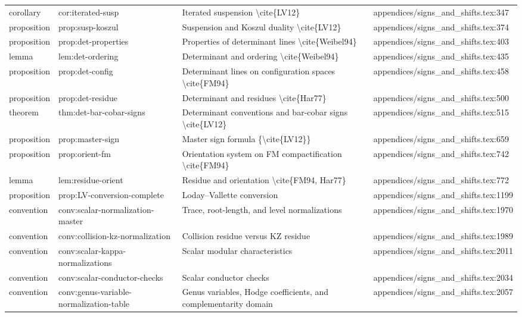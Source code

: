 \documentclass[11pt]{article}
\begin{document}
\begin{longtable}{L{0.10\textwidth}L{0.26\textwidth}L{0.42\textwidth}L{0.22\textwidth}}
corollary & cor:iterated-susp & Iterated suspension \textbackslash{}cite\{LV12\} & appendices/signs\_and\_shifts.tex:347\\
proposition & prop:susp-koszul & Suspension and Koszul duality \textbackslash{}cite\{LV12\} & appendices/signs\_and\_shifts.tex:374\\
proposition & prop:det-properties & Properties of determinant lines \textbackslash{}cite\{Weibel94\} & appendices/signs\_and\_shifts.tex:403\\
lemma & lem:det-ordering & Determinant and ordering \textbackslash{}cite\{Weibel94\} & appendices/signs\_and\_shifts.tex:435\\
proposition & prop:det-config & Determinant lines on configuration spaces \textbackslash{}cite\{FM94\} & appendices/signs\_and\_shifts.tex:458\\
proposition & prop:det-residue & Determinant and residues \textbackslash{}cite\{Har77\} & appendices/signs\_and\_shifts.tex:500\\
theorem & thm:det-bar-cobar-signs & Determinant conventions and bar-cobar signs \textbackslash{}cite\{LV12\} & appendices/signs\_and\_shifts.tex:515\\
proposition & prop:master-sign & Master sign formula \{\textbackslash{}cite\{LV12\}\} & appendices/signs\_and\_shifts.tex:659\\
proposition & prop:orient-fm & Orientation system on FM compactification \textbackslash{}cite\{FM94\} & appendices/signs\_and\_shifts.tex:742\\
lemma & lem:residue-orient & Residue and orientation \textbackslash{}cite\{FM94, Har77\} & appendices/signs\_and\_shifts.tex:772\\
proposition & prop:LV-conversion-complete & Loday--Vallette conversion & appendices/signs\_and\_shifts.tex:1199\\
convention & conv:scalar-normalization-master & Trace, root-length, and level normalizations & appendices/signs\_and\_shifts.tex:1970\\
convention & conv:collision-kz-normalization & Collision residue versus KZ residue & appendices/signs\_and\_shifts.tex:1989\\
convention & conv:scalar-kappa-normalizations & Scalar modular characteristics & appendices/signs\_and\_shifts.tex:2011\\
convention & conv:scalar-conductor-checks & Scalar conductor checks & appendices/signs\_and\_shifts.tex:2034\\
convention & conv:genus-variable-normalization-table & Genus variables, Hodge coefficients, and complementarity domain & appendices/signs\_and\_shifts.tex:2057\\

\end{longtable}
\end{document}
